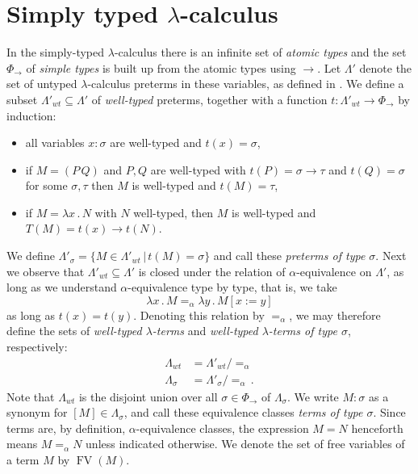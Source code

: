 \documentclass[english,letter paper,12pt,leqno]{article}
\def\ldot{\,.\,}
\def\FV{\operatorname{FV}}
\def\typearrow{\rightarrow}
\def\ldot{\,.\,}
\def\typearrow{\Rightarrow}
\def\FV{\operatorname{FV}}
\newcommand{\lto}{\longrightarrow}
\def\l{\,|\,}
\theoremstyle{example}
\numberwithin{equation}{section}
\def\ldot{\,.\,}
\def\FV{\operatorname{FV}}
\def\typearrow{\rightarrow}
\begin{document}
\section{Simply typed $\lambda$-calculus}
In the simply-typed $\lambda$-calculus \cite[Chapter 3]{sorensen} there is an infinite set of \emph{atomic types} and the set $\Phi_{\typearrow}$ of \emph{simple types} is built up from the atomic types using $\typearrow$. Let $\Lambda'$ denote the set of untyped $\lambda$-calculus preterms in these variables, as defined in \cite[Chapter 1]{sorensen}. We define a subset $\Lambda'_{wt} \subseteq \Lambda'$ of \emph{well-typed} preterms, together with a function $t: \Lambda'_{wt} \lto \Phi_{\typearrow}$ by induction:
\begin{itemize}
	\item all variables $x : \sigma$ are well-typed and $t(x) = \sigma$,
	\item if $M = (P \, Q)$ and $P,Q$ are well-typed with $t(P) = \sigma \typearrow \tau$ and $t(Q) = \sigma$ for some $\sigma, \tau$ then $M$ is well-typed and $t(M) = \tau$,
	\item if $M = \lambda x\ldot N$ with $N$ well-typed, then $M$ is well-typed and $T(M) = t(x) \typearrow t(N)$.
\end{itemize}
We define $\Lambda'_\sigma = \{ M \in \Lambda'_{wt} \l t(M) = \sigma \}$ and call these \emph{preterms of type $\sigma$}. Next we observe that $\Lambda'_{wt} \subseteq \Lambda'$ is closed under the relation of $\alpha$-equivalence on $\Lambda'$, as long as we understand $\alpha$-equivalence type by type, that is, we take
\[
\lambda x \ldot M =_\alpha \lambda y\ldot M[x := y]
\]
as long as $t(x) = t(y)$. Denoting this relation by $=_\alpha$, we may therefore define the sets of \emph{well-typed $\lambda$-terms} and \emph{well-typed $\lambda$-terms of type $\sigma$}, respectively:
\begin{align}
	\Lambda_{wt} &= \Lambda'_{wt} / =_\alpha\,\\
	\Lambda_\sigma &= \Lambda'_\sigma / =_\alpha\,.
\end{align}
Note that $\Lambda_{wt}$ is the disjoint union over all $\sigma \in \Phi_{\typearrow}$ of $\Lambda_\sigma$. We write $M: \sigma$ as a synonym for $[M] \in \Lambda_\sigma$, and call these equivalence classes \emph{terms of type $\sigma$}. Since terms are, by definition, $\alpha$-equivalence classes, the expression $M = N$ henceforth means $M =_\alpha N$ unless indicated otherwise. We denote the set of free variables of a term $M$ by $\FV(M)$.
\end{document}
